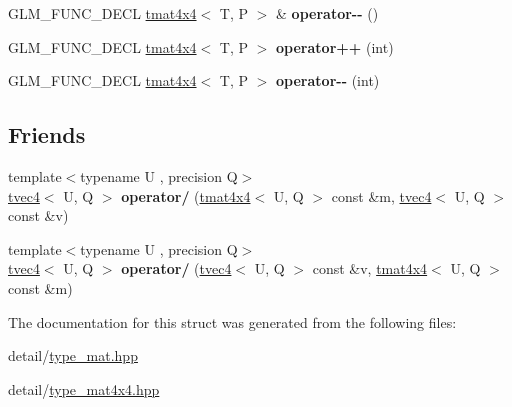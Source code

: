 \begin{DoxyCompactItemize}
\item 
\hypertarget{structglm_1_1tmat4x4_ac2e012f874e85167d87ca6fff0d422a1}{G\-L\-M\-\_\-\-F\-U\-N\-C\-\_\-\-D\-E\-C\-L \hyperlink{structglm_1_1tmat4x4}{tmat4x4}$<$ T, P $>$ \& {\bfseries operator-\/-\/} ()}\label{structglm_1_1tmat4x4_ac2e012f874e85167d87ca6fff0d422a1}

\item 
\hypertarget{structglm_1_1tmat4x4_a3df7de16e36a0d4da69af1fe89f86dd0}{G\-L\-M\-\_\-\-F\-U\-N\-C\-\_\-\-D\-E\-C\-L \hyperlink{structglm_1_1tmat4x4}{tmat4x4}$<$ T, P $>$ {\bfseries operator++} (int)}\label{structglm_1_1tmat4x4_a3df7de16e36a0d4da69af1fe89f86dd0}

\item 
\hypertarget{structglm_1_1tmat4x4_a884c9dac2bb42ff8cf30266c27835c8d}{G\-L\-M\-\_\-\-F\-U\-N\-C\-\_\-\-D\-E\-C\-L \hyperlink{structglm_1_1tmat4x4}{tmat4x4}$<$ T, P $>$ {\bfseries operator-\/-\/} (int)}\label{structglm_1_1tmat4x4_a884c9dac2bb42ff8cf30266c27835c8d}

\end{DoxyCompactItemize}
\subsection*{Friends}
\begin{DoxyCompactItemize}
\item 
\hypertarget{structglm_1_1tmat4x4_a4d1472f6e50839c280a3a7f32396b3f1}{{\footnotesize template$<$typename U , precision Q$>$ }\\\hyperlink{structglm_1_1tvec4}{tvec4}$<$ U, Q $>$ {\bfseries operator/} (\hyperlink{structglm_1_1tmat4x4}{tmat4x4}$<$ U, Q $>$ const \&m, \hyperlink{structglm_1_1tvec4}{tvec4}$<$ U, Q $>$ const \&v)}\label{structglm_1_1tmat4x4_a4d1472f6e50839c280a3a7f32396b3f1}

\item 
\hypertarget{structglm_1_1tmat4x4_a786a67d54520cab5d9ecd91530012ac2}{{\footnotesize template$<$typename U , precision Q$>$ }\\\hyperlink{structglm_1_1tvec4}{tvec4}$<$ U, Q $>$ {\bfseries operator/} (\hyperlink{structglm_1_1tvec4}{tvec4}$<$ U, Q $>$ const \&v, \hyperlink{structglm_1_1tmat4x4}{tmat4x4}$<$ U, Q $>$ const \&m)}\label{structglm_1_1tmat4x4_a786a67d54520cab5d9ecd91530012ac2}

\end{DoxyCompactItemize}


The documentation for this struct was generated from the following files\-:\begin{DoxyCompactItemize}
\item 
detail/\hyperlink{type__mat_8hpp}{type\-\_\-mat.\-hpp}\item 
detail/\hyperlink{type__mat4x4_8hpp}{type\-\_\-mat4x4.\-hpp}\end{DoxyCompactItemize}
